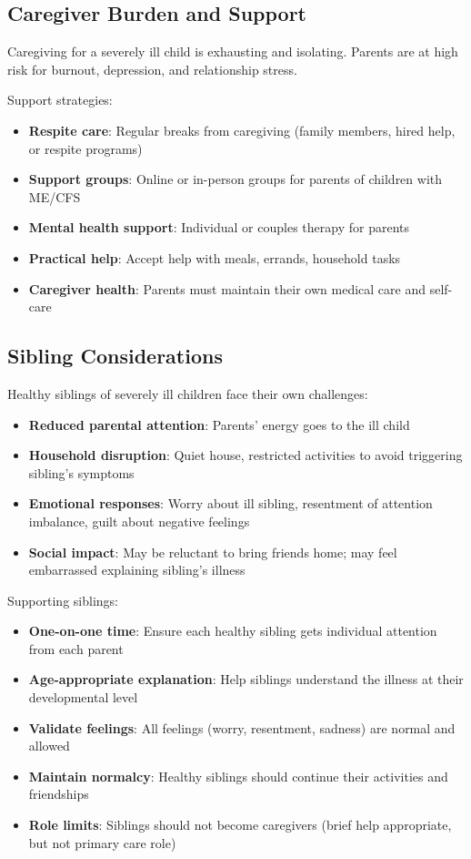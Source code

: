 \subsection{Caregiver Burden and Support}

Caregiving for a severely ill child is exhausting and isolating. Parents are at high risk for burnout, depression, and relationship stress.

Support strategies:
\begin{itemize}
    \item \textbf{Respite care}: Regular breaks from caregiving (family members, hired help, or respite programs)
    \item \textbf{Support groups}: Online or in-person groups for parents of children with ME/CFS
    \item \textbf{Mental health support}: Individual or couples therapy for parents
    \item \textbf{Practical help}: Accept help with meals, errands, household tasks
    \item \textbf{Caregiver health}: Parents must maintain their own medical care and self-care
\end{itemize}

\subsection{Sibling Considerations}

Healthy siblings of severely ill children face their own challenges:

\begin{itemize}
    \item \textbf{Reduced parental attention}: Parents' energy goes to the ill child
    \item \textbf{Household disruption}: Quiet house, restricted activities to avoid triggering sibling's symptoms
    \item \textbf{Emotional responses}: Worry about ill sibling, resentment of attention imbalance, guilt about negative feelings
    \item \textbf{Social impact}: May be reluctant to bring friends home; may feel embarrassed explaining sibling's illness
\end{itemize}

Supporting siblings:
\begin{itemize}
    \item \textbf{One-on-one time}: Ensure each healthy sibling gets individual attention from each parent
    \item \textbf{Age-appropriate explanation}: Help siblings understand the illness at their developmental level
    \item \textbf{Validate feelings}: All feelings (worry, resentment, sadness) are normal and allowed
    \item \textbf{Maintain normalcy}: Healthy siblings should continue their activities and friendships
    \item \textbf{Role limits}: Siblings should not become caregivers (brief help appropriate, but not primary care role)
\end{itemize}

